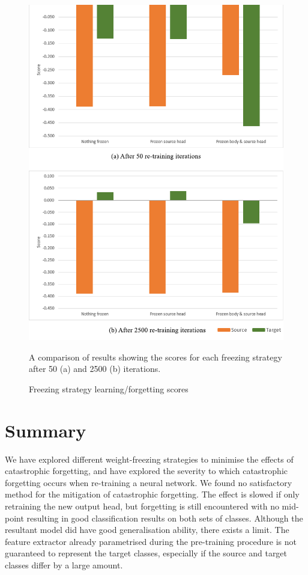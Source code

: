 \documentclass{report}
\begin{document}
	\begin{figure}[h]
		\centering
		\includegraphics[width=12cm]{book2}
		\caption{Freezing strategy learning/forgetting scores}
		A comparison of results showing the scores for each freezing strategy after 50 (a) and 2500 (b) iterations.
		\label{fig:book:2}
	\end{figure}

		
	\section{Summary}
	We have explored different weight-freezing strategies to minimise the effects of catastrophic forgetting, and have explored the severity to which catastrophic forgetting occurs when re-training a neural network. We found no satisfactory method for the mitigation of catastrophic forgetting. The effect is slowed if only retraining the new output head, but forgetting is still encountered with no mid-point resulting in good classification results on both sets of classes. Although the resultant model did have good generalisation ability, there exists a limit. The feature extractor already parametrised during the pre-training procedure is not guaranteed to represent the target classes, especially if the source and target classes differ by a large amount. \par	
	
	\printbibliography
		
\end{document}
